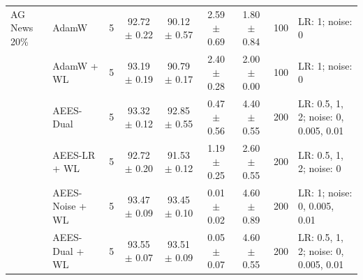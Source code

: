 \begin{table}[htbp]
{\begin{tabular}{llccccccl}
\midrule
AG News 20\% & AdamW & 5 & 92.72 $\pm$ 0.22 & 90.12 $\pm$ 0.57 & 2.59 $\pm$ 0.69 & 1.80 $\pm$ 0.84 & 100 & LR: 1; noise: 0 \\
 & AdamW + WL & 5 & 93.19 $\pm$ 0.19 & 90.79 $\pm$ 0.17 & 2.40 $\pm$ 0.28 & 2.00 $\pm$ 0.00 & 100 & LR: 1; noise: 0 \\
 & AEES-Dual & 5 & 93.32 $\pm$ 0.12 & 92.85 $\pm$ 0.55 & 0.47 $\pm$ 0.56 & 4.40 $\pm$ 0.55 & 200 & LR: 0.5, 1, 2; noise: 0, 0.005, 0.01 \\
 & AEES-LR + WL & 5 & 92.72 $\pm$ 0.20 & 91.53 $\pm$ 0.12 & 1.19 $\pm$ 0.25 & 2.60 $\pm$ 0.55 & 200 & LR: 0.5, 1, 2; noise: 0 \\
 & AEES-Noise + WL & 5 & 93.47 $\pm$ 0.09 & 93.45 $\pm$ 0.10 & 0.01 $\pm$ 0.02 & 4.60 $\pm$ 0.89 & 200 & LR: 1; noise: 0, 0.005, 0.01 \\
 & AEES-Dual + WL & 5 & 93.55 $\pm$ 0.07 & 93.51 $\pm$ 0.09 & 0.05 $\pm$ 0.07 & 4.60 $\pm$ 0.55 & 200 & LR: 0.5, 1, 2; noise: 0, 0.005, 0.01 \\
\bottomrule
\end{tabular}
}
\end{table}
